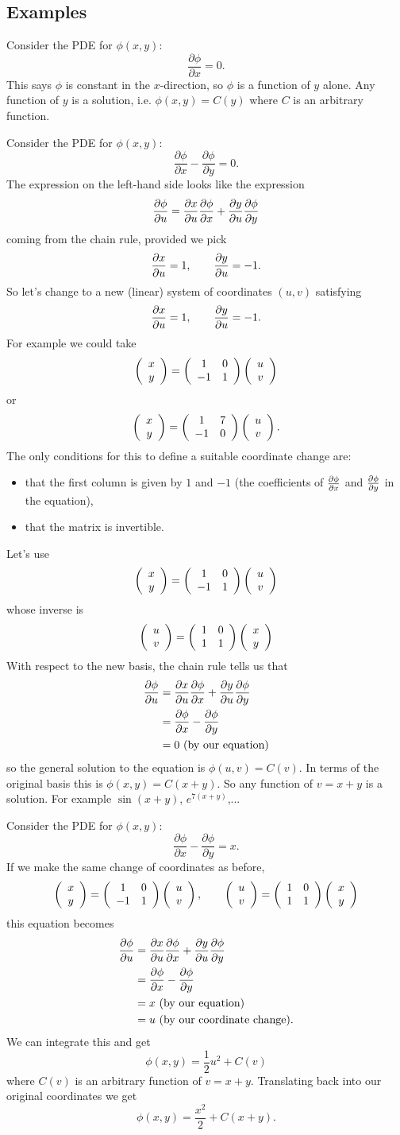 \subsection{Examples}
\begin{exm}
Consider the PDE for $\phi(x,y)$:
\[\frac{\partial\phi}{\partial x}=0.\]
This says $\phi$ is constant in the $x$-direction, so $\phi$ is a function of $y$ alone. Any function of $y$ is a solution, i.e. $\phi(x,y)=C(y)$ where $C$ is an arbitrary function.
\end{exm}
\begin{exm}
Consider the PDE for $\phi(x,y)$:
\[\frac{\partial\phi}{\partial x}-\frac{\partial\phi}{\partial y}=0.\]
The expression on the left-hand side looks like the expression
\[\frac{\partial \phi}{\partial u}=\frac{\partial x}{\partial u}\frac{\partial \phi}{\partial x}+\frac{\partial y}{\partial u}\frac{\partial \phi}{\partial y}\]
coming from the chain rule, provided we pick
\[\frac{\partial x}{\partial u}=1,\qquad\frac{\partial y}{\partial u}=-1.\]
So let's change to a new (linear) system of coordinates $(u,v)$ satisfying
\[\frac{\partial x}{\partial u}=1,\qquad\frac{\partial y}{\partial u}=-1.\]
For example we could take
\[\left(\begin{array}{c}x\\y\end{array}\right)=\left(\begin{array}{cc}1&0\\-1&1\end{array}\right)\left(\begin{array}{c}u\\v\end{array}\right)\]
or
\[\left(\begin{array}{c}x\\y\end{array}\right)=\left(\begin{array}{cc}1&7\\-1&0\end{array}\right)\left(\begin{array}{c}u\\v\end{array}\right).\]
The only conditions for this to define a suitable coordinate change are:
\begin{itemize}
\item that the first column is given by $1$ and $-1$ (the coefficients of $\frac{\partial \phi}{\partial x}$ and $\frac{\partial \phi}{\partial y}$ in the equation),
\item that the matrix is invertible.
\end{itemize}
Let's use
\[\left(\begin{array}{c}x\\y\end{array}\right)=\left(\begin{array}{cc}1&0\\-1&1\end{array}\right)\left(\begin{array}{c}u\\v\end{array}\right)\]
whose inverse is
\[\left(\begin{array}{c}u\\v\end{array}\right)=\left(\begin{array}{cc}1&0\\1&1\end{array}\right)\left(\begin{array}{c}x\\y\end{array}\right)\]
With respect to the new basis, the chain rule tells us that
\begin{align*}
\frac{\partial \phi}{\partial u}&=\frac{\partial x}{\partial u}\frac{\partial \phi}{\partial x}+\frac{\partial y}{\partial u}\frac{\partial \phi}{\partial y}\\
            &=\frac{\partial \phi}{\partial x}-\frac{\partial \phi}{\partial y}\\
            &=0\mbox{ (by our equation)}
\end{align*}
so the general solution to the equation is $\phi(u,v)=C(v)$. In terms of the original basis this is $\phi(x,y)=C(x+y)$. So any function of $v=x+y$ is a solution. For example $\sin(x+y)$, $e^{7(x+y)}$,...
\end{exm}
\begin{exm}
Consider the PDE for $\phi(x,y)$:
\[\frac{\partial\phi}{\partial x}-\frac{\partial\phi}{\partial y}=x.\]
If we make the same change of coordinates as before,
\[\left(\begin{array}{c}x\\y\end{array}\right)=\left(\begin{array}{cc}1&0\\-1&1\end{array}\right)\left(\begin{array}{c}u\\v\end{array}\right),\qquad \left(\begin{array}{c}u\\v\end{array}\right)=\left(\begin{array}{cc}1&0\\1&1\end{array}\right)\left(\begin{array}{c}x\\y\end{array}\right)\]
this equation becomes
\begin{align*}
\frac{\partial \phi}{\partial u}&=\frac{\partial x}{\partial u}\frac{\partial \phi}{\partial x}+\frac{\partial y}{\partial u}\frac{\partial \phi}{\partial y}\\
            &=\frac{\partial \phi}{\partial x}-\frac{\partial \phi}{\partial y}\\
            &=x\mbox{ (by our equation)}\\
            &=u\mbox{ (by our coordinate change).}
\end{align*}
We can integrate this and get
\[\phi(x,y)=\frac{1}{2}u^2+C(v)\]
where $C(v)$ is an arbitrary function of $v=x+y$. Translating back into our original coordinates we get
\[\phi(x,y)=\frac{x^2}{2}+C\left(x+y\right).\]
\end{exm}
